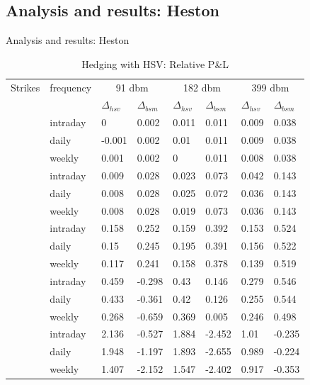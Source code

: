 \documentclass{beamer}
\begin{document}
\subsection{Analysis and results: Heston}
\begin{frame}{Analysis and results: Heston}

\begin{table}[ht]
\small
\centering
\begin{tabular}{llllllll}
  \hline
  \hline
Strikes & frequency  &\multicolumn{2}{c}{91 dbm} & \multicolumn{2}{c}{182 dbm} & \multicolumn{2}{c}{399 dbm} \\ 
   &  & $\Delta_{hsv}$ & $\Delta_{bsm}$ & $\Delta_{hsv}$ & $\Delta_{bsm}$ & $\Delta_{hsv}$ & $\Delta_{bsm}$ \\ 
   \hdashline
  \multirow{3}{*}{140} & intraday & 0 & 0.002 & 0.011 & 0.011 & 0.009 & 0.038 \\ 
  & daily & -0.001 & 0.002 & 0.01 & 0.011 & 0.009 & 0.038 \\ 
  & weekly & 0.001 & 0.002 & 0 & 0.011 & 0.008 & 0.038 \\ 
  \hdashline
  \multirow{3}{*}{160} & intraday & 0.009 & 0.028 & 0.023 & 0.073 & 0.042 & 0.143 \\ 
  & daily & 0.008 & 0.028 & 0.025 & 0.072 & 0.036 & 0.143 \\ 
  & weekly & 0.008 & 0.028 & 0.019 & 0.073 & 0.036 & 0.143 \\ 
  \hdashline
  \multirow{3}{*}{186} & intraday & 0.158 & 0.252 & 0.159 & 0.392 & 0.153 & 0.524 \\ 
  & daily & 0.15 & 0.245 & 0.195 & 0.391 & 0.156 & 0.522 \\ 
  & weekly & 0.117 & 0.241 & 0.158 & 0.378 & 0.139 & 0.519 \\ 
  \hdashline 
  \multirow{3}{*}{200} & intraday & 0.459 & -0.298 & 0.43 & 0.146 & 0.279 & 0.546 \\ 
  & daily & 0.433 & -0.361 & 0.42 & 0.126 & 0.255 & 0.544 \\ 
  & weekly & 0.268 & -0.659 & 0.369 & 0.005 & 0.246 & 0.498 \\ 
  \hdashline 
  \multirow{3}{*}{230} & intraday & 2.136 & -0.527 & 1.884 & -2.452 & 1.01 & -0.235 \\ 
  & daily & 1.948 & -1.197 & 1.893 & -2.655 & 0.989 & -0.224 \\ 
  & weekly & 1.407 & -2.152 & 1.547 & -2.402 & 0.917 & -0.353 \\ 
   \hline
\end{tabular}
\caption{Hedging with HSV: Relative P\&L} 
\label{t:analysis:heston:pl}
\end{table}
 
\end{frame}
\end{document}
